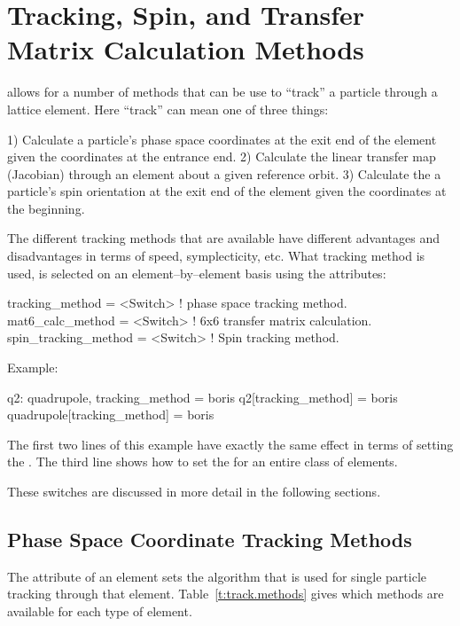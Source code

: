\chapter{Tracking, Spin, and Transfer Matrix Calculation Methods}
\label{c:methods}

\bmad allows for a number of methods that can be use to ``track'' a particle
through a lattice element. Here ``track'' can mean one of three things:
\begin{example}
  1) Calculate a particle's phase space coordinates at the exit 
     end of the element given the coordinates at the entrance end.
  2) Calculate the linear transfer map (Jacobian) through an element
     about a given reference orbit.
  3) Calculate the a particle's spin orientation at the exit end 
     of the element given the coordinates at the beginning.
\end{example}
The different tracking methods that are available have different
advantages and disadvantages in terms of speed, symplecticity, etc.
What tracking method is used, is selected on an element--by--element
basis using the attributes:
\begin{example}
  tracking_method      = <Switch>   ! phase space tracking method.
  mat6_calc_method     = <Switch>   ! 6x6 transfer matrix calculation.
  spin_tracking_method = <Switch>   ! Spin tracking method.
\end{example}
Example:
\begin{example}
  q2: quadrupole, tracking_method = boris
  q2[tracking_method] = boris
  quadrupole[tracking_method] = boris
\end{example}
The first two lines of this example have exactly the same effect in
terms of setting the . The third line shows how to
set the  for an entire class of elements.

These switches are discussed in more detail in the following sections.

\section{Phase Space Coordinate Tracking Methods}
\label{s:tkm}

The  attribute of an element sets the algorithm
that is used for single particle tracking through that element.
Table~\ref{t:track.methods} gives which methods are available for each
type of element.

